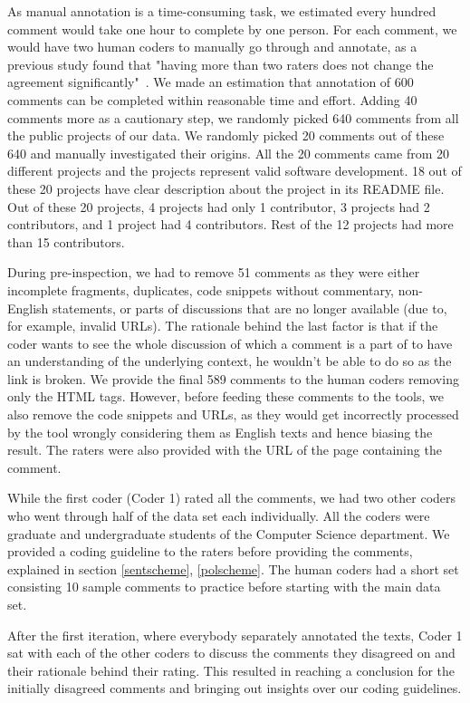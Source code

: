 As manual annotation is a time-consuming task, we estimated 
every hundred comment 
would take one hour to complete by one person. For each comment, we would have two human coders to manually go through and annotate, as a previous study found that "having more than two raters does not change the agreement significantly"~\cite{murgia2014developers}. We made an estimation that annotation of 600 comments can be completed within reasonable time and effort.
Adding 40 comments more as a cautionary step, 
we randomly picked 640 comments 
from all the public projects of our data.
We randomly picked 
20 comments out of these 640 and 
manually investigated their origins.
All the 20 comments came from 20 different projects 
and the projects represent valid software development.
18 out of these 20 projects have clear description 
about the project in its README file.
Out of these 20 projects, 
4 projects had only 1 contributor, 
3 projects had 2 contributors, 
and 1 project had 4 contributors.
Rest of the 12 projects had more than 15 contributors.

During pre-inspection, we had to remove 51 comments as they were either incomplete fragments, duplicates, code snippets without commentary, non-English statements, or parts of discussions that are no longer available (due to, for example, invalid URLs). The rationale behind the last factor is that if the coder wants to see the whole discussion of which a comment is a part of to have an understanding of the underlying context, he wouldn't be able to do so as the link is broken. We provide the final 589 comments to the human coders removing only the HTML tags. However, before feeding these comments to the tools, we also remove the code snippets and URLs, as they would get incorrectly processed by the tool wrongly considering them as English texts and hence biasing the result. The raters were also provided with the URL of the page containing the comment.

While the first coder (Coder 1) rated all the comments, we had two other coders who went through half of the data set each individually. All the coders were graduate and undergraduate students 
of the Computer Science department. 
We provided a coding guideline to the raters before providing the comments, explained in section \ref{sentscheme}, \ref{polscheme}. 
The human coders had a short set 
consisting 10 sample comments 
to practice before starting 
with the main data set.

After the first iteration, where everybody separately annotated the texts, Coder 1 sat with each of the other coders to discuss the comments they disagreed on and their rationale behind their rating. This resulted in reaching a conclusion for the initially disagreed comments and bringing out insights over our coding guidelines.



